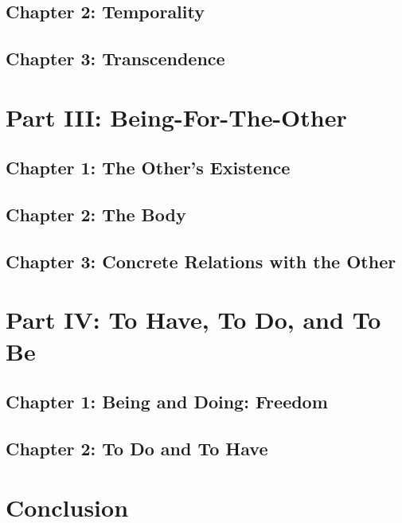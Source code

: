 \subsection{Chapter 2: Temporality}

\subsection{Chapter 3: Transcendence}

\section{Part III: Being-For-The-Other}

\subsection{Chapter 1: The Other's Existence}

\subsection{Chapter 2: The Body}

\subsection{Chapter 3: Concrete Relations with the Other}

\section{Part IV: To Have, To Do, and To Be}

\subsection{Chapter 1: Being and Doing: Freedom}

\subsection{Chapter 2: To Do and To Have}

\section{Conclusion}

